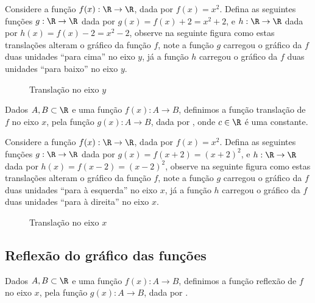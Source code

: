  \begin{exem}
  Considere a função $f(x): \R \to \R$, dada por $f(x)= x^2$. Defina as seguintes funções $g: \R \to \R$ dada por $g(x)= f(x) + 2= x^2 + 2$, e $h: \R \to \R$ dada por $h(x)= f(x) - 2= x^2 - 2$, observe na seguinte figura como estas translações alteram o gráfico da função $f$, note a função $g$ carregou o gráfico da $f$ duas unidades ``para cima'' no eixo $y$, já a função $h$ carregou o gráfico da $f$ duas unidades ``para baixo'' no eixo $y$.

 \begin{figure}[H]
\caption{Translação no eixo $y$}
  \end{figure}

 \end{exem}

  Dados $A, B \subset \R$ e uma função $f(x): A \to B$, definimos a função translação de $f$ no eixo $x$, pela função $g(x): A \to B$, dada por , onde $c \in \R$ é uma constante.

 \begin{exem}
  Considere a função $f(x): \R \to \R$, dada por $f(x)= x^2$. Defina as seguintes funções $g: \R \to \R$ dada por $g(x)= f(x + 2)= (x+2)^2$, e $h: \R \to \R$ dada por $h(x)= f(x-2)= (x-2)^2$, observe na seguinte figura como estas translações alteram o gráfico da função $f$, note a função $g$ carregou o gráfico da $f$ duas unidades ``para à esquerda'' no eixo $x$, já a função $h$ carregou o gráfico da $f$ duas unidades ``para à direita'' no eixo $x$.

 \begin{figure}[H]
\caption{Translação no eixo $x$}
  \end{figure}

 \end{exem}

 \subsection{Reflexão do gráfico das funções}

 Dados $A, B \subset \R$ e uma função $f(x): A \to B$, definimos a função reflexão de $f$ no eixo $x$, pela função $g(x): A \to B$, dada por .

